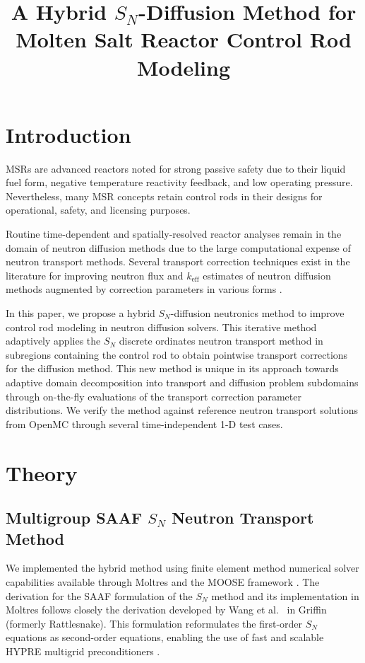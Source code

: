 \documentclass[letterpaper]{mc2025}
\title{A Hybrid $S_N$-Diffusion Method for Molten Salt Reactor Control Rod Modeling}
\begin{document}
\section{Introduction}\label{sec:1}

\glspl*{MSR} are advanced reactors noted for strong passive safety due to their liquid fuel form,
negative temperature reactivity feedback, and low operating pressure. Nevertheless,
many \gls*{MSR} concepts retain control rods in their designs for operational, safety, and
licensing purposes.

Routine time-dependent and spatially-resolved reactor analyses remain in the domain of neutron
diffusion methods due to the large computational expense of neutron transport methods. Several
transport correction techniques exist in the literature for improving neutron flux and
$k_\text{eff}$ estimates of neutron diffusion methods augmented by correction parameters in
various forms \cite{kavenoky_sph_1978, koebke_new_1980, gross_comprehensive_2023,
tamang_multilevel_2014, stehle_hybrid_2014}.

In this paper, we propose a hybrid $S_N$-diffusion neutronics method to improve control rod
modeling in neutron diffusion solvers. This iterative method adaptively applies the $S_N$ discrete
ordinates neutron transport method in subregions containing the control rod to obtain pointwise
transport corrections for the diffusion method.
This new method is unique in its approach towards adaptive domain decomposition into transport and
diffusion problem subdomains through on-the-fly evaluations of the transport correction
parameter distributions. We verify the method against reference neutron transport solutions from
OpenMC through several time-independent 1-D test cases.

\section{Theory} \label{sec:theory}

\subsection{Multigroup \Gls{SAAF} $S_N$ Neutron Transport Method} \label{sec:saaf}

We implemented the hybrid method using finite element method numerical solver capabilities available through
Moltres \cite{lindsay_introduction_2018} and the \gls*{MOOSE} framework \cite{giudicelli_30_2024}.
The derivation for the \gls*{SAAF} formulation of the $S_N$ method and its
implementation in Moltres follows closely the derivation developed by Wang et al.\
\cite{wang_diffusion_2014} in Griffin (formerly Rattlesnake). This formulation reformulates
the first-order $S_N$ equations as second-order equations, enabling the use of fast and scalable
HYPRE multigrid preconditioners \cite{hypre_hypre_2022}.
\end{document}
